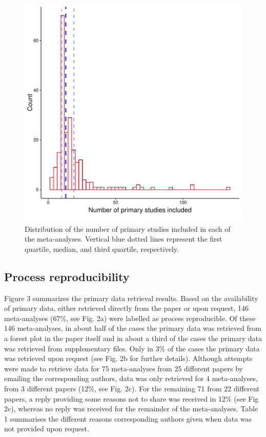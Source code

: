 \documentclass[
  ,apa7,floatsintext]{apa6}
\begin{document}
\begin{figure}
\centering
\includegraphics{manuscript_files/figure-latex/unnamed-chunk-1-1.pdf}
\caption{\label{fig:unnamed-chunk-1}Distribution of the number of primary studies included in each of the meta-analyses. Vertical blue dotted lines represent the first quartile, median, and third quartile, respectively.}
\end{figure}

\hypertarget{process-reproducibility}{%
\subsection{Process reproducibility}\label{process-reproducibility}}

Figure 3 summarizes the primary data retrieval results. Based on the availability of primary data, either retrieved directly from the paper or upon request, 146 meta-analyses (67\%, see Fig. 2a) were labelled as process reproducible. Of these 146 meta-analyses, in about half of the cases the primary data was retrieved from a forest plot in the paper itself and in about a third of the cases the primary data was retrieved from supplementary files. Only in 3\% of the cases the primary data was retrieved upon request (see Fig. 2b for further details). Although attempts were made to retrieve data for 75 meta-analyses from 25 different papers by emailing the corresponding authors, data was only retrieved for 4 meta-analyses, from 3 different papers (12\%, see Fig. 2c). For the remaining 71 from 22 different papers, a reply providing some reasons not to share was received in 12\% (see Fig 2c), whereas no reply was received for the remainder of the meta-analyses. Table 1 summarises the different reasons corresponding authors given when data was not provided upon request.
\end{document}
